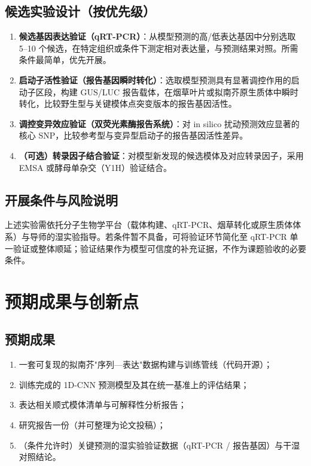 \documentclass[UTF8,11pt,a4paper]{ctexart}
\begin{document}
\subsection{候选实验设计（按优先级）}
\label{sec:wetlab-design}

\begin{enumerate}
\item \textbf{候选基因表达验证（qRT-PCR）}：从模型预测的高/低表达基因中分别选取 5--10 个候选，在特定组织或条件下测定相对表达量，与预测结果对照。所需条件最简单，优先开展。
\item \textbf{启动子活性验证（报告基因瞬时转化）}：选取模型预测具有显著调控作用的启动子区段，构建 GUS/LUC 报告载体，在烟草叶片或拟南芥原生质体中瞬时转化，比较野生型与关键模体点突变版本的报告基因活性。
\item \textbf{调控变异效应验证（双荧光素酶报告系统）}：对 in silico 扰动预测效应显著的核心 SNP，比较参考型与变异型启动子的报告基因活性差异。
\item \textbf{（可选）转录因子结合验证}：对模型新发现的候选模体及对应转录因子，采用 EMSA 或酵母单杂交（Y1H）验证结合。
\end{enumerate}

\subsection{开展条件与风险说明}
\label{sec:wetlab-cond}

上述实验需依托分子生物学平台（载体构建、qRT-PCR、烟草转化或原生质体体系）与导师的湿实验指导。若条件暂不具备，可将验证环节简化至 qRT-PCR 单一验证或整体顺延；验证结果作为模型可信度的补充证据，不作为课题验收的必要条件。

\section{预期成果与创新点}
\label{sec:output}

\subsection{预期成果}
\label{sec:output-list}

\begin{enumerate}
\item 一套可复现的拟南芥"序列—表达"数据构建与训练管线（代码开源）；
\item 训练完成的 1D-CNN 预测模型及其在统一基准上的评估结果；
\item 表达相关顺式模体清单与可解释性分析报告；
\item 研究报告一份（并可整理为论文投稿）；
\item （条件允许时）关键预测的湿实验验证数据（qRT-PCR / 报告基因）与干湿对照结论。
\end{enumerate}
\end{document}
